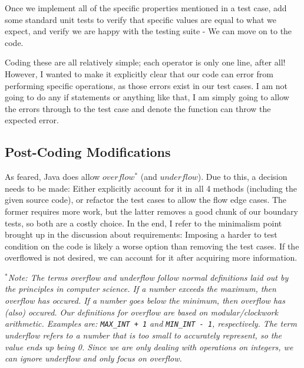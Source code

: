 \documentclass{article}
\begin{document}
Once we implement all of the specific properties mentioned in a test
case, add some standard unit tests to verify that specific values are
equal to what we expect, and verify we are happy with the testing
suite - We can move on to the code.

\medskip

Coding these are all relatively simple; each operator is only one
line, after all! However, I wanted to make it explicitly clear that
our code can error from performing specific operations, as those
errors exist in our test cases. I am not going to do any if statements
or anything like that, I am simply going to allow the errors through
to the test case and denote the function can throw the expected error.

\subsection{Post-Coding Modifications}

As feared, Java does allow $overflow^*$ (and $underflow$). Due to
this, a decision needs to be made: Either explicitly account for it in
all 4 methods (including the given source code), or refactor the test
cases to allow the flow edge cases. The former requires more work, but
the latter removes a good chunk of our boundary tests, so both are a
costly choice. In the end, I refer to the minimalism point brought up
in the discussion about requirements: Imposing a harder to test
condition on the code is likely a worse option than removing the test
cases. If the overflowed is not desired, we can account for it after
acquiring more information.

\newpage

\textit{$^*$Note: The terms overflow and underflow follow normal definitions laid out by the principles in computer science. If a number exceeds the maximum, then overflow has occured. If a number goes below the minimum, then overflow has (also) occured. Our definitions for overflow are based on modular/clockwork arithmetic. Examples are: \texttt{MAX_INT + 1} and \texttt{MIN_INT - 1}, respectively. The term underflow refers to a number that is too small to accurately represent, so the value ends up being 0. Since we are only dealing with operations on integers, we can ignore underflow and only focus on overflow.}
\end{document}
